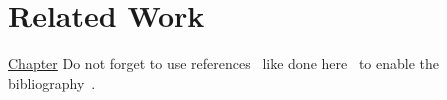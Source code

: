 \chapter{Related Work}
\label{sec:relatedWork}

\hyperref[sec:index]{Chapter} \Blindtext[12] Do not forget to use references~\cite{Hanser2019energy} like done here~\cite{Hofmann2019dependentVectors} to enable the bibliography~\cite{Jung2017tumble, Sagrista2019GaiaSky, Sdeo2018fullerene, Zheng2019equivalence}.